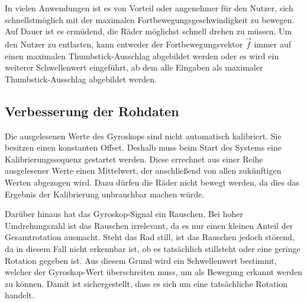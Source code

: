 In vielen Anwendungen ist es von Vorteil oder angenehmer für den Nutzer, sich schnellstmöglich mit der maximalen Fortbewegungsgeschwindigkeit zu bewegen.
Auf Dauer ist es ermüdend, die Räder möglichst schnell drehen zu müssen.
Um den Nutzer zu entlasten, kann entweder der Fortbewegungsvektor $\vec{f}$ immer auf einen maximalen Thumbstick-Ausschlag abgebildet werden oder es wird ein weiterer Schwellenwert eingeführt, ab dem alle Eingaben als maximaler Thumbstick-Ausschlag abgebildet werden.

\subsection{Verbesserung der Rohdaten}
Die ausgelesenen Werte des Gyroskops sind nicht automatisch kalibriert.
Sie besitzen einen konstanten Offset. Deshalb muss beim Start des Systems eine Kalibrierungssequenz gestartet werden.
Diese errechnet aus einer Reihe ausgelesener Werte einen Mittelwert, der anschließend von allen zukünftigen Werten abgezogen wird.
Dazu dürfen die Räder nicht bewegt werden, da dies das Ergebnis der Kalibrierung unbrauchbar machen würde.

Darüber hinaus hat das Gyroskop-Signal ein Rauschen.
Bei hoher Umdrehungszahl ist das Rauschen irrelevant, da es nur einen kleinen Anteil der Gesamtrotation ausmacht.
Steht das Rad still, ist das Rauschen jedoch störend, da in diesem Fall nicht erkennbar ist, ob es tatsächlich stillsteht oder eine geringe Rotation gegeben ist.
Aus diesem Grund wird ein Schwellenwert bestimmt, welcher der Gyroskop-Wert überschreiten muss, um als Bewegung erkannt werden zu können.
Damit ist sichergestellt, dass es sich um eine tatsächliche Rotation handelt.

